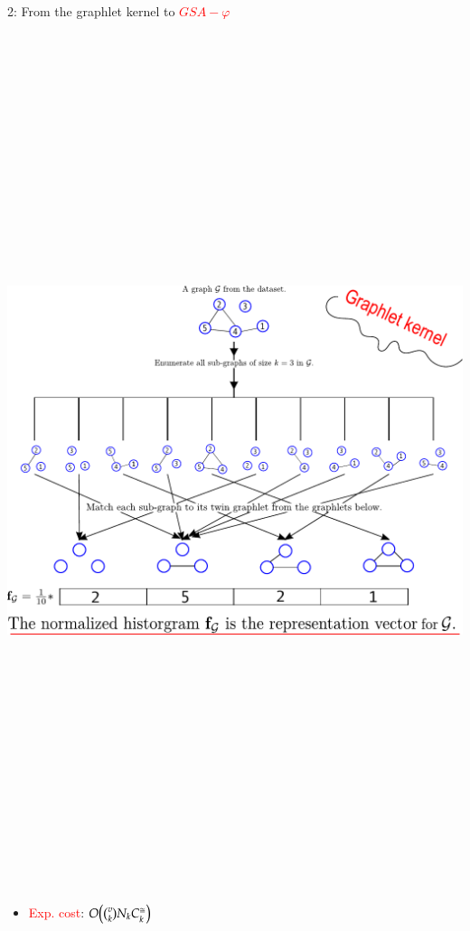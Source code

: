 \documentclass[final,dvipsnames]{beamer}
\newcommand{\vsp}{\vspace{10pt}}
\newcommand{\myemph}[1]{\textcolor{red}{#1}}
\begin{document}
\begin{frame}{}
\begin{columns}[t]
\begin{column}{0.45\linewidth}
\begin{block}{2: From the graphlet kernel to \myemph{$GSA-\varphi$}}
\begin{minipage}{.99\linewidth}
		\begin{mynotablock}
			\vsp
			\parbox{0.4\textwidth}{
				\includegraphics[height=25cm]{figs/gk.pdf}
			}
			\hfill
			\parbox{0.35\textwidth}{
				\large
				\begin{itemize}
					\item  \myemph{Exp. cost}:  $O\big(\tbinom{v}{k} N_k C^{\cong}_k\big)$ \vsp
					\begin{itemize}

\end{itemize}
\end{itemize}}
\end{mynotablock}
\end{minipage}
\end{block}
\end{column}
\end{columns}
\end{frame}
\end{document}

